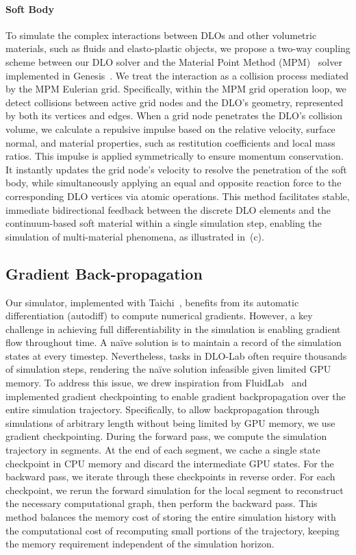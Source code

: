 \paragraph{Soft Body} To simulate the complex interactions between DLOs and other volumetric materials, such as fluids and elasto-plastic objects, we propose a two-way coupling scheme between our DLO solver and the Material Point Method (MPM)~\citep{jiang2016material,hu2018moving} solver implemented in Genesis~\cite{Genesis}. We treat the interaction as a collision process mediated by the MPM Eulerian grid. Specifically, within the MPM grid operation loop, we detect collisions between active grid nodes and the DLO's geometry, represented by both its vertices and edges. When a grid node penetrates the DLO's collision volume, we calculate a repulsive impulse based on the relative velocity, surface normal, and material properties, such as restitution coefficients and local mass ratios. This impulse is applied symmetrically to ensure momentum conservation. It instantly updates the grid node's velocity to resolve the penetration of the soft body, while simultaneously applying an equal and opposite reaction force to the corresponding DLO vertices via atomic operations. This method facilitates stable, immediate bidirectional feedback between the discrete DLO elements and the continuum-based soft material within a single simulation step, enabling the simulation of multi-material phenomena, as illustrated in~(c).


\subsection{Gradient Back-propagation}

Our simulator, implemented with Taichi~\citep{hu2019taichi,hu2020difftaichi}, benefits from its automatic differentiation (autodiff) to compute numerical gradients. However, a key challenge in achieving full differentiability in the simulation is enabling gradient flow throughout time. A naïve solution is to maintain a record of the simulation states at every timestep. Nevertheless, tasks in DLO-Lab often require thousands of simulation steps, rendering the naïve solution infeasible given limited GPU memory. To address this issue, we drew inspiration from FluidLab~\citep{xianfluidlab} and implemented gradient checkpointing to enable gradient backpropagation over the entire simulation trajectory. Specifically, to allow backpropagation through simulations of arbitrary length without being limited by GPU memory, we use gradient checkpointing. During the forward pass, we compute the simulation trajectory in segments. At the end of each segment, we cache a single state checkpoint in CPU memory and discard the intermediate GPU states. For the backward pass, we iterate through these checkpoints in reverse order. For each checkpoint, we rerun the forward simulation for the local segment to reconstruct the necessary computational graph, then perform the backward pass. This method balances the memory cost of storing the entire simulation history with the computational cost of recomputing small portions of the trajectory, keeping the memory requirement independent of the simulation horizon.
